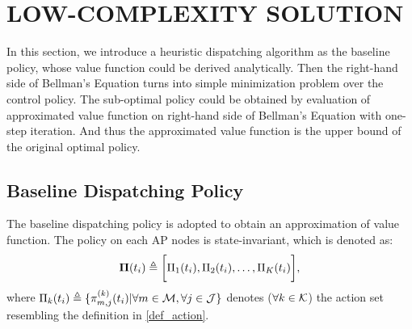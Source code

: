 \section{LOW-COMPLEXITY SOLUTION}

In this section, we introduce a heuristic dispatching algorithm as the baseline policy, whose value function could be derived analytically.
Then the right-hand side of Bellman's Equation turns into simple minimization problem over the control policy. The sub-optimal policy could be obtained by evaluation of approximated value function on right-hand side of Bellman's Equation with one-step iteration. And thus the approximated value function is the upper bound of the original optimal policy.

\subsection{Baseline Dispatching Policy}
The baseline dispatching policy is adopted to obtain an approximation of value function. The policy on each AP nodes is state-invariant, which is denoted as:
\begin{align}
    \boldsymbol{\Pi}(t_i) \triangleq \bigg[\Pi_1(t_i), \Pi_2(t_i), \dots, \Pi_K(t_i)\bigg],
\end{align}
where $\Pi_k(t_i) \triangleq \{\pi^{(k)}_{m,j}(t_{i}) | \forall m\in\mathcal{M},\forall j\in\mathcal{J}\}$ denotes ($\forall k\in\mathcal{K}$) the action set resembling the definition in \ref{def_action}.

